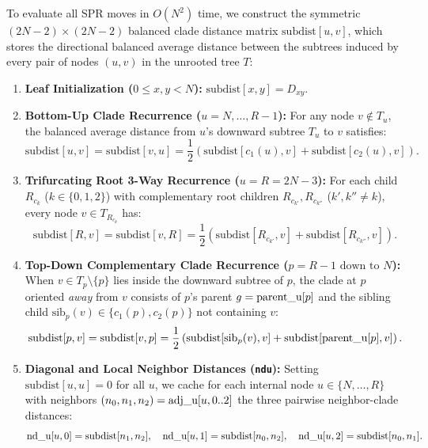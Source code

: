 \documentclass[11pt,a4paper]{article}
\makeatletter
\DeclareRobustCommand{\_}{\ifmmode\nfss@text{\textunderscore}\else\textunderscore\allowbreak\fi}
\theoremstyle{definition}
\makeatother
\begin{document}
To evaluate all SPR moves in $O(N^2)$ time, we construct the symmetric $(2N-2) \times (2N-2)$ balanced clade distance matrix $\text{subdist}[u, v]$, which stores the directional balanced average distance between the subtrees induced by every pair of nodes $(u, v)$ in the unrooted tree $T$:
\begin{enumerate}
    \item \textbf{Leaf Initialization ($0 \le x, y < N$):} $\text{subdist}[x, y] = D_{xy}$.
    \item \textbf{Bottom-Up Clade Recurrence ($u = N, \dots, R-1$):} For any node $v \notin T_u$, the balanced average distance from $u$'s downward subtree $T_u$ to $v$ satisfies:
    \begin{equation}
    \text{subdist}[u, v] = \text{subdist}[v, u] = \frac{1}{2}\left(\text{subdist}[c_1(u), v] + \text{subdist}[c_2(u), v]\right).
    \label{eq:bottom_up}
    \end{equation}
    \item \textbf{Trifurcating Root 3-Way Recurrence ($u = R = 2N-3$):} For each child $R_{c_k}$ ($k \in \{0, 1, 2\}$) with complementary root children $R_{c_{k'}}, R_{c_{k''}}$ ($k', k'' \neq k$), every node $v \in T_{R_{c_k}}$ has:
    \begin{equation}
    \text{subdist}[R, v] = \text{subdist}[v, R] = \frac{1}{2}\left(\text{subdist}[R_{c_{k'}}, v] + \text{subdist}[R_{c_{k''}}, v]\right).
    \label{eq:root_3way}
    \end{equation}
    \item \textbf{Top-Down Complementary Clade Recurrence ($p = R-1 \text{ down to } N$):} When $v \in T_p \setminus \{p\}$ lies inside the downward subtree of $p$, the clade at $p$ oriented \emph{away} from $v$ consists of $p$'s parent $g = \text{parent\_u}[p]$ and the sibling child $\text{sib}_p(v) \in \{c_1(p), c_2(p)\}$ not containing $v$:
    \begin{equation}
    \text{subdist}[p, v] = \text{subdist}[v, p] = \frac{1}{2}\left(\text{subdist}[\text{sib}_p(v), v] + \text{subdist}[\text{parent\_u}[p], v]\right).
    \label{eq:top_down}
    \end{equation}
    \item \textbf{Diagonal and Local Neighbor Distances (\texttt{nd\_u}):} Setting $\text{subdist}[u, u] = 0$ for all $u$, we cache for each internal node $u \in \{N, \dots, R\}$ with neighbors $(n_0, n_1, n_2) = \text{adj\_u}[u, 0..2]$ the three pairwise neighbor-clade distances:
    \begin{equation}
    \text{nd\_u}[u, 0] = \text{subdist}[n_1, n_2], \quad \text{nd\_u}[u, 1] = \text{subdist}[n_0, n_2], \quad \text{nd\_u}[u, 2] = \text{subdist}[n_0, n_1].
    \end{equation}
\end{enumerate}
\end{document}
